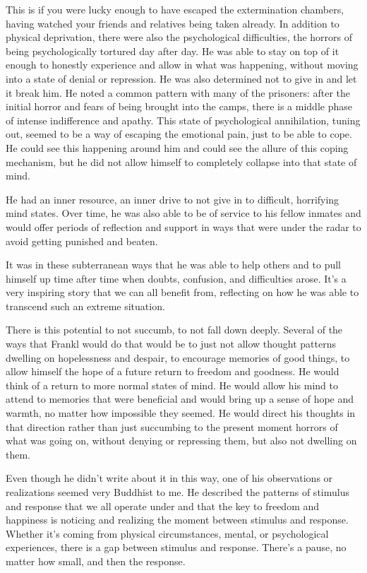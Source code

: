 This is if you were lucky enough to have escaped the extermination chambers, having watched your friends and relatives being taken already. In addition to physical deprivation, there were also the psychological difficulties, the horrors of being psychologically tortured day after day. He was able to stay on top of it enough to honestly experience and allow in what was happening, without moving into a state of denial or repression. He was also determined not to give in and let it break him. He noted a common pattern with many of the prisoners: after the initial horror and fears of being brought into the camps, there is a middle phase of intense indifference and apathy. This state of psychological annihilation, tuning out, seemed to be a way of escaping the emotional pain, just to be able to cope. He could see this happening around him and could see the allure of this coping mechanism, but he did not allow himself to completely collapse into that state of mind.

He had an inner resource, an inner drive to not give in to difficult, horrifying mind states. Over time, he was also able to be of service to his fellow inmates and would offer periods of reflection and support in ways that were under the radar to avoid getting punished and beaten.

It was in these subterranean ways that he was able to help others and to pull himself up time after time when doubts, confusion, and difficulties arose. It's a very inspiring story that we can all benefit from, reflecting on how he was able to transcend such an extreme situation.

There is this potential to not succumb, to not fall down deeply. Several of the ways that Frankl would do that would be to just not allow thought patterns dwelling on hopelessness and despair, to encourage memories of good things, to allow himself the hope of a future return to freedom and goodness. He would think of a return to more normal states of mind. He would allow his mind to attend to memories that were beneficial and would bring up a sense of hope and warmth, no matter how impossible they seemed. He would direct his thoughts in that direction rather than just succumbing to the present moment horrors of what was going on, without denying or repressing them, but also not dwelling on them.

Even though he didn't write about it in this way, one of his observations or realizations seemed very Buddhist to me. He described the patterns of stimulus and response that we all operate under and that the key to freedom and happiness is noticing and realizing the moment between stimulus and response. Whether it's coming from physical circumstances, mental, or psychological experiences, there is a gap between stimulus and response. There's a pause, no matter how small, and then the response.


